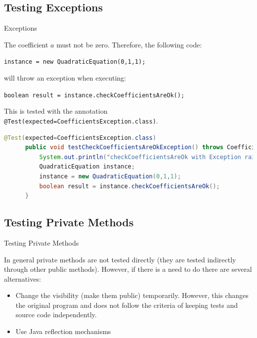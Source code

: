 \documentclass[11pt, xcolor=svgnames]{beamer}
\begin{document}

\subsection{Testing Exceptions}



\begin{frame}[fragile]{Exceptions}

  The coefficient $a$ must not be zero. Therefore, the following code:
  
  \texttt{instance = new QuadraticEquation(0,1,1);}
  
  will throw an exception when executing:
  
  \texttt{boolean result = instance.checkCoefficientsAreOk();}
  
  This is tested with the annotation \texttt{@Test(expected=CoefficientsException.class)}.
  
  \begin{lstlisting}[language=JAVA,basicstyle=\scriptsize]
      @Test(expected=CoefficientsException.class)
      public void testCheckCoefficientsAreOkException() throws CoefficientsException {
          System.out.println("checkCoefficientsAreOk with Exception raised");
          QuadraticEquation instance;
          instance = new QuadraticEquation(0,1,1);
          boolean result = instance.checkCoefficientsAreOk();
      }
  \end{lstlisting}
  
  \end{frame}


\subsection{Testing Private Methods}


\begin{frame}{Testing Private Methods}

In general private methods are not tested directly (they are tested indirectly through other public methods). However, if there is a need to do there are several alternatives:

\begin{itemize}
 \item Change the visibility (make them public) temporarily. However, this changes the original program and does not follow the criteria of keeping tests and source code independently.
 \item Use Java reflection mechanisms
\end{itemize}


\end{frame}
\end{document}
